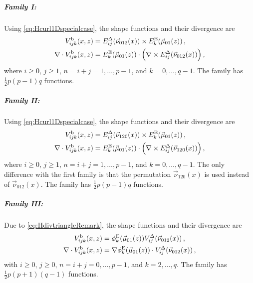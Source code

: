 \subparagraph{Family I:}
Using \eqref{eq:Hcurl1Dspecialcase}, the shape functions and their divergence are
\begin{equation}
	\begin{aligned}	
		V_{ijk}^\mathrm{b}(x,z)&=E_{ij}^\Delta(\vec{\nu}_{012}(x))\times E_k^{\mathrm{E}}(\vec{\mu}_{01}(z))\,,\\
		\nabla\cdot V_{ijk}^\mathrm{b}(x,z)&=E_k^{\mathrm{E}}(\vec{\mu}_{01}(z))\cdot\Big(\nabla\times E_{ij}^\Delta(\vec{\nu}_{012}(x))\Big)\,,
	\end{aligned}
\end{equation}
where $i\geq0$, $j\geq1$, $n=i+j=1,\ldots,p-1$, and $k=0,\ldots,q-1$. 
The family has $\frac{1}{2}p(p-1)q$ functions.

\subparagraph{Family II:}
Using \eqref{eq:Hcurl1Dspecialcase}, the shape functions and their divergence are
\begin{equation}
	\begin{aligned}	
		V_{ijk}^\mathrm{b}(x,z)&=E_{ij}^\Delta(\vec{\nu}_{120}(x))\times E_k^{\mathrm{E}}(\vec{\mu}_{01}(z))\,,\\
		\nabla\cdot V_{ijk}^\mathrm{b}(x,z)&=E_k^{\mathrm{E}}(\vec{\mu}_{01}(z))\cdot\Big(\nabla\times E_{ij}^\Delta(\vec{\nu}_{120}(x))\Big)\,,
	\end{aligned}
\end{equation}
where $i\geq0$, $j\geq1$, $n=i+j=1,\ldots,p-1$, and $k=0,\ldots,q-1$.
The only difference with the first family is that the permutation $\vec{\nu}_{120}(x)$ is used instead of $\vec{\nu}_{012}(x)$.
The family has $\frac{1}{2}p(p-1)q$ functions.

\subparagraph{Family III:}
Due to \eqref{eq:HdivtriangleRemark}, the shape functions and their divergence are
\begin{equation}
	\begin{aligned}	
		V_{ijk}^\mathrm{b}(x,z)&=\phi_k^{\mathrm{E}}(\vec{\mu}_{01}(z))V_{ij}^\Delta(\vec{\nu}_{012}(x))\,,\\
		\nabla\cdot V_{ijk}^\mathrm{b}(x,z)&=\nabla\phi_k^{\mathrm{E}}(\vec{\mu}_{01}(z))\cdot V_{ij}^\Delta(\vec{\nu}_{012}(x))\,,
	\end{aligned}
\end{equation}
with $i\geq0$, $j\geq0$, $n=i+j=0,\ldots,p-1$, and $k=2,\ldots,q$. 
The family has $\frac{1}{2}p(p+1)(q-1)$ functions.



